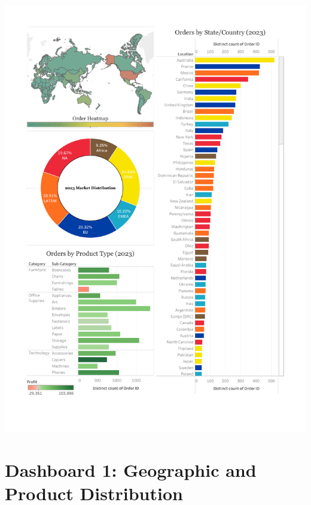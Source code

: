\documentclass[12pt,a4paper]{article}
\begin{document}
\newpage

\null
\clearpage

\tableofcontents  %


\noindent
\includegraphics[width=\paperwidth,height=\paperheight,keepaspectratio]{Dashboard1.pdf}

\restoregeometry

\newpage

\section{Dashboard 1: Geographic and Product Distribution}
\end{document}
